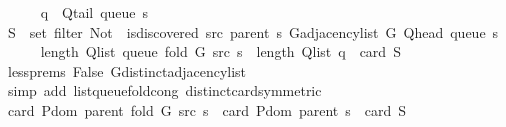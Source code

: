 \begin{isabellebody}
\ \ \ \ \isamarkupfalse%
\ {\isacharquery}{\kern0pt}q\ {\isacharequal}{\kern0pt}\ {\isachardoublequoteopen}Q{\isacharunderscore}{\kern0pt}tail\ {\isacharparenleft}{\kern0pt}queue\ s{\isacharparenright}{\kern0pt}{\isachardoublequoteclose}\isanewline
\ \ \ \ \isamarkupfalse%
\ {\isacharquery}{\kern0pt}S\ {\isacharequal}{\kern0pt}\ {\isachardoublequoteopen}set\ {\isacharparenleft}{\kern0pt}filter\ {\isacharparenleft}{\kern0pt}Not\ {\isasymcirc}\ is{\isacharunderscore}{\kern0pt}discovered\ src\ {\isacharparenleft}{\kern0pt}parent\ s{\isacharparenright}{\kern0pt}{\isacharparenright}{\kern0pt}\ {\isacharparenleft}{\kern0pt}G{\isachardot}{\kern0pt}adjacency{\isacharunderscore}{\kern0pt}list\ G\ {\isacharparenleft}{\kern0pt}Q{\isacharunderscore}{\kern0pt}head\ {\isacharparenleft}{\kern0pt}queue\ s{\isacharparenright}{\kern0pt}{\isacharparenright}{\kern0pt}{\isacharparenright}{\kern0pt}{\isacharparenright}{\kern0pt}{\isachardoublequoteclose}\isanewline
\isanewline
\ \ \ \ \isamarkupfalse%
\ {\isachardoublequoteopen}length\ {\isacharparenleft}{\kern0pt}Q{\isacharunderscore}{\kern0pt}list\ {\isacharparenleft}{\kern0pt}queue\ {\isacharparenleft}{\kern0pt}fold\ G\ src\ s{\isacharparenright}{\kern0pt}{\isacharparenright}{\kern0pt}{\isacharparenright}{\kern0pt}\ {\isacharequal}{\kern0pt}\ length\ {\isacharparenleft}{\kern0pt}Q{\isacharunderscore}{\kern0pt}list\ {\isacharquery}{\kern0pt}q{\isacharparenright}{\kern0pt}\ {\isacharplus}{\kern0pt}\ card\ {\isacharquery}{\kern0pt}S{\isachardoublequoteclose}\isanewline
\ \ \ \ \ \ \isamarkupfalse%
\ less{\isachardot}{\kern0pt}prems{\isacharparenleft}{\kern0pt}{}{\isacharminus}{\kern0pt}{}{\isacharparenright}{\kern0pt}\ False\ G{\isachardot}{\kern0pt}distinct{\isacharunderscore}{\kern0pt}adjacency{\isacharunderscore}{\kern0pt}list\isanewline
\ \ \ \ \ \ \isamarkupfalse%
\ {\isacharparenleft}{\kern0pt}simp\ add{\isacharcolon}{\kern0pt}\ list{\isacharunderscore}{\kern0pt}queue{\isacharunderscore}{\kern0pt}fold{\isacharunderscore}{\kern0pt}cong{\isacharunderscore}{\kern0pt}{}\ distinct{\isacharunderscore}{\kern0pt}card{\isacharbrackleft}{\kern0pt}symmetric{\isacharbrackright}{\kern0pt}{\isacharparenright}{\kern0pt}\isanewline
\ \ \ \ \isamarkupfalse%
\ \isamarkupfalse%
\ {\isachardoublequoteopen}card\ {\isacharparenleft}{\kern0pt}P{\isachardot}{\kern0pt}dom\ {\isacharparenleft}{\kern0pt}parent\ {\isacharparenleft}{\kern0pt}fold\ G\ src\ s{\isacharparenright}{\kern0pt}{\isacharparenright}{\kern0pt}{\isacharparenright}{\kern0pt}\ {\isacharequal}{\kern0pt}\ card\ {\isacharparenleft}{\kern0pt}P{\isachardot}{\kern0pt}dom\ {\isacharparenleft}{\kern0pt}parent\ s{\isacharparenright}{\kern0pt}{\isacharparenright}{\kern0pt}\ {\isacharplus}{\kern0pt}\ card\ {\isacharquery}{\kern0pt}S{\isachardoublequoteclose}\isanewline

\end{isabellebody}
